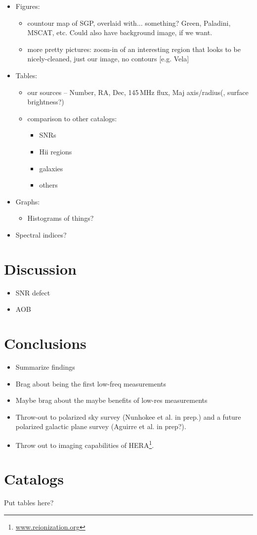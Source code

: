 \documentclass[useAMS,usenatbib]{mn2e}
\begin{document}
\begin{itemize}
\item Figures:
\begin{itemize}
	\item countour map of SGP, overlaid with... something? Green, Paladini, MSCAT, etc. Could also have background image, if we want.
	\item more pretty pictures: zoom-in of an interesting region that looks to be nicely-cleaned, just our image, no contours [e.g. Vela]
\end{itemize}
\item Tables: 
	\begin{itemize}
	\item our sources -- Number, RA, Dec, 145\,MHz flux, Maj axis/radius(, surface brightness?)
	\item comparison to other catalogs:
		\begin{itemize}
		\item SNRs
		\item H{\sc ii} regions
		\item galaxies
		\item others
		\end{itemize}
	\end{itemize}	
\item Graphs:
	\begin{itemize}
	\item Histograms of things?
	\end{itemize}
\item Spectral indices?
\end{itemize}


\section{Discussion}
\label{sec:disc}

\begin{itemize}
\item SNR defect
\item AOB
\end{itemize}

\section{Conclusions}
\label{sec:conc}

\begin{itemize}
\item Summarize findings
\item Brag about being the first low-freq measurements
\item Maybe brag about the maybe benefits of low-res measurements
\item Throw-out to polarized sky survey (Nunhokee et al. in prep.) and a future polarized galactic plane survey (Aguirre et al. in prep?).
\item Throw out to imaging capabilities of HERA\footnote{\url{www.reionization.org}}.
\end{itemize}

\appendix
\section{Catalogs}
Put tables here?

\clearpage

{}
\end{document}
